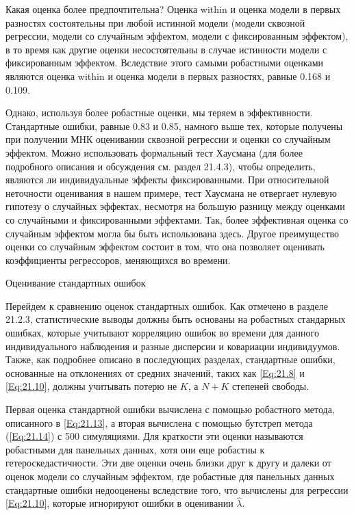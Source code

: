 Какая оценка более предпочтительна? Оценка within и оценка модели в первых разностях состоятельны при любой истинной модели (модели сквозной регрессии, модели со случайным эффектом, модели с фиксированным эффектом), в то время как другие оценки несостоятельны в случае истинности модели с фиксированным эффектом. Вследствие этого  самыми робастными оценками являются оценка within и оценка модели в первых разностях, равные 0.168 и 0.109.

Однако, используя более робастные оценки, мы теряем в эффективности. Стандартные ошибки, равные 0.83 и 0.85, намного выше тех, которые получены при получении МНК оценивании сквозной регрессии и оценки со случайным эффектом. Можно использовать формальный тест Хаусмана (для более подробного описания и обсуждения см. раздел 21.4.3), чтобы определить, являются ли индивидуальные эффекты фиксированными. При относительной неточности оценивания в нашем примере, тест Хаусмана не отвергает нулевую гипотезу о случайных эффектах, несмотря на большую разницу между оценками со случайными и фиксированными эффектами. Так, более эффективная оценка со случайным эффектом могла бы быть использована здесь. Другое преимущество оценки со случайным эффектом состоит в том, что она позволяет оценивать коэффициенты регрессоров, меняющихся во времени.

{\centering
Оценивание стандартных ошибок\\}

Перейдем к сравнению оценок стандартных ошибок. Как отмечено в разделе 21.2.3, статистические выводы должны быть основаны на робастных стандарных ошибках, которые учитывают корреляцию ошибок во времени для данного индивидуального наблюдения и разные дисперсии и ковариации индивидуумов. Также, как подробнее описано в последующих разделах, стандартные ошибки, основанные на отклонениях от средних значений, таких как \ref{Eq:21.8} и \ref{Eq:21.10},  должны учитывать потерю не $K$, а $N+K$ степеней свободы.

Первая оценка стандартной ошибки вычислена с помощью робастного метода, описанного в  \ref{Eq:21.13}, а вторая вычислена с помощью бутстреп метода (\ref{Eq:21.14}) с 500 симуляциями. Для краткости эти оценки называются робастными для панельных данных, хотя они еще робастны к гетероскедастичности. Эти две оценки очень близки друг к другу и далеки от оценок модели со случайным эффектом, где робастные для панельных данных стандартные ошибки недооценены вследствие того, что вычислены для регрессии \ref{Eq:21.10}, которые игнорируют ошибки в оценивании $\hat{\lambda}$.

